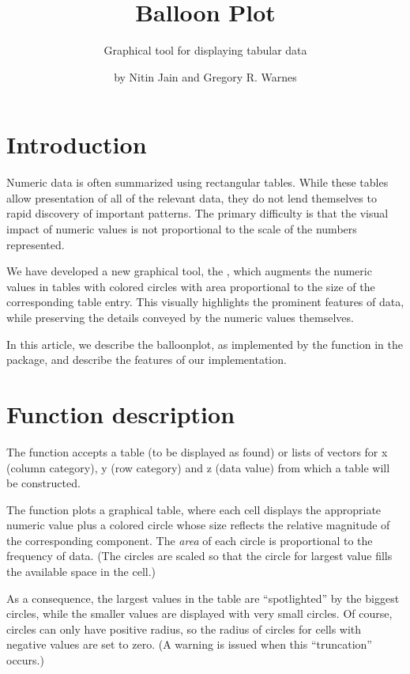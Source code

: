 \documentclass[a4paper]{report}
\begin{document}
\begin{article}
\author{by Nitin Jain and Gregory R. Warnes}
\title{Balloon Plot}
\subtitle{Graphical tool for displaying tabular data}

\maketitle

\section*{Introduction}

Numeric data is often summarized using rectangular tables. While
these tables allow presentation of all of the relevant data, they do
not lend themselves to rapid discovery of important patterns. The
primary difficulty is that the visual impact of numeric values is
not proportional to the scale of the numbers represented.

We have developed a new graphical tool, the ,
which augments the numeric values in tables with colored circles
with area proportional to the size of the corresponding table
entry. This visually highlights the prominent features of
data, while preserving the details conveyed by the numeric values
themselves.

In this article, we describe the balloonplot, as
implemented by the  function in the
 package, and describe the features of our
implementation.


\section*{Function description}

The  function accepts a table (to be displayed as
found) or lists of vectors for x (column category), y (row category)
and z (data value) from which a table will be constructed.

The  function plots a graphical table,
where each cell displays the appropriate numeric value plus a
colored circle whose size reflects the relative magnitude of the
corresponding component. The
\emph{area} of each circle is proportional to the frequency of
data. (The circles are scaled so that the circle for largest value
fills the available space in the cell.)


As a consequence, the largest values in the table are ``spotlighted''
by the biggest circles, while the smaller values are displayed
with very small circles.  Of course, circles can only have positive
radius, so the radius of circles for cells with negative values are
set to zero.  (A warning is issued when this ``truncation'' occurs.)


\end{article}
\end{document}
